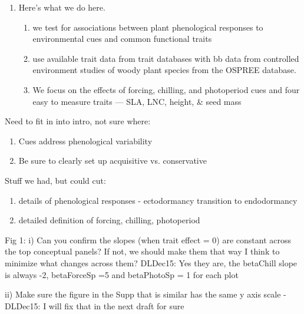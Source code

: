 \documentclass{article}
\begin{document}
\begin{enumerate}
\item Here's what we do here.
\begin{enumerate}
\item we test for associations between plant phenological responses to environmental cues and common functional traits 
\item use available trait data from trait databases with bb data from controlled environment studies of woody plant species from the OSPREE database.
\item We focus on the effects of forcing, chilling, and photoperiod cues and four easy to measure traits — SLA, LNC, height, \& seed mass
\end{enumerate}

\end{enumerate}

Need to fit in into intro, not sure where:
\begin{enumerate}
\item Cues address phenological variability
\item Be sure to clearly set up acquisitive vs. conservative
\end{enumerate}

Stuff we had, but could cut:
\begin{enumerate}
\item details of phenological responses - ectodormancy transition to endodormancy 
\item detailed definition of forcing, chilling, photoperiod
\end{enumerate}

Fig 1:
i) Can you confirm the slopes (when trait effect = 0) are constant across the top conceptual panels? If not, we should make them that way I think to minimize what changes across them?
DLDec15: Yes they are, the betaChill slope is always -2, betaForceSp =5 and betaPhotoSp = 1 for each plot

ii) Make sure the figure in the Supp that is similar has the same y axis scale -
DLDec15: I will fix that in the next draft for sure
\end{document}
